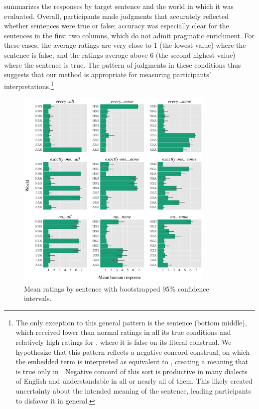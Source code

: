 \documentclass[leqno,12pt]{article}
\begin{document}
 summarizes the responses by target sentence
and the world in which it was evaluated. Overall, participants made
judgments that accurately reflected whether sentences were true or
false; accuracy was especially clear for the sentences in the first
two columns, which do not admit pragmatic enrichment. For these cases,
the average ratings are very close to 1 (the lowest
value) where the sentence is false, and the ratings average above 6
(the second highest value) where the sentence is true. The pattern of
judgments in these conditions thus suggests that our method is
appropriate for measuring participants' interpretations.\footnote{The
  only exception to this general pattern is the sentence  (bottom middle), which received
  lower than normal ratings in all its true conditions and relatively
  high ratings for , where it is false on its literal
  construal. We hypothesize that this pattern reflects a negative
  concord construal, on which the embedded term is interpreted as
  equivalent to , creating a meaning that is
  true only in . Negative concord of this sort is
  productive in many dialects of English and understandable in all or
  nearly all of them. This likely created uncertainty about the
  intended meaning of the sentence, leading participants to disfavor
  it in general.}

\begin{figure}[!ht]
  \centering
  \includegraphics[width=0.85\textwidth]{fig/basketball-pilot-2-11-14-results-parsed}
  \caption{Mean ratings by sentence with bootstrapped 95\% confidence intervals.}
  \label{fig:exp1-results}
\end{figure}
\end{document}
